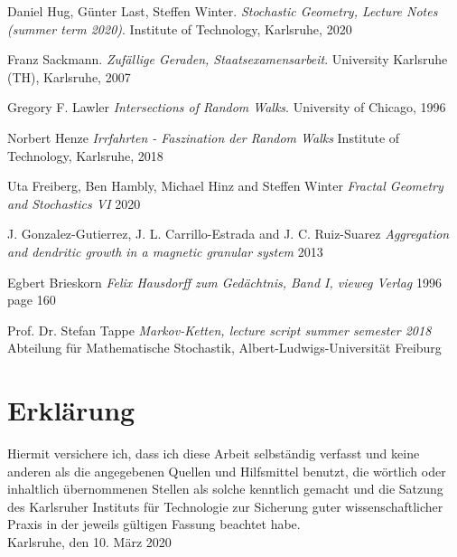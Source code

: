 \documentclass[12pt,a4paper]{scrartcl}
\numberwithin{equation}{subsection}
\newcommand{\1}{\mathbbm{1}}
\numberwithin{equation}{section}
\theoremstyle{definition}
\begin{document}
\newpage

\begin{thebibliography}{biblio}
\thispagestyle{empty}

Daniel Hug, Günter Last, Steffen Winter.
\emph{Stochastic Geometry, 	Lecture Notes (summer term 2020)}.
Institute of Technology, Karlsruhe, 2020

Franz Sackmann. 
\emph{Zufällige Geraden, Staatsexamensarbeit}.
University Karlsruhe (TH), Karlsruhe, 2007

Gregory F. Lawler
\emph{Intersections of Random Walks}.
University of Chicago, 1996

Norbert Henze
\emph{Irrfahrten - Faszination der Random Walks}
Institute of Technology, Karlsruhe, 2018

Uta Freiberg, Ben Hambly, Michael Hinz and Steffen Winter
\emph{Fractal Geometry and Stochastics VI}
2020

J. Gonzalez-Gutierrez, J. L. Carrillo-Estrada and J. C. Ruiz-Suarez
\emph{Aggregation and dendritic growth in a magnetic granular system}
2013

Egbert Brieskorn
\emph{Felix Hausdorff zum Gedächtnis, Band I, vieweg Verlag}
1996
page 160

Prof. Dr. Stefan Tappe
\emph{Markov-Ketten, lecture script summer semester 2018}
Abteilung für Mathematische Stochastik, Albert-Ludwigs-Universität Freiburg



\end{thebibliography}

\newpage
  
\thispagestyle{empty}

\vspace*{8cm}


\section*{Erklärung}

Hiermit versichere ich, dass ich diese Arbeit selbständig verfasst und keine anderen als die angegebenen Quellen und Hilfsmittel benutzt, die wörtlich oder inhaltlich übernommenen Stellen als solche kenntlich gemacht und die Satzung des Karlsruher Instituts für Technologie zur Sicherung guter wissenschaftlicher Praxis in der jeweils gültigen Fassung beachtet habe. \\[2ex] 

\noindent
Karlsruhe, den 10. März 2020\\[5ex] 
\end{document}
